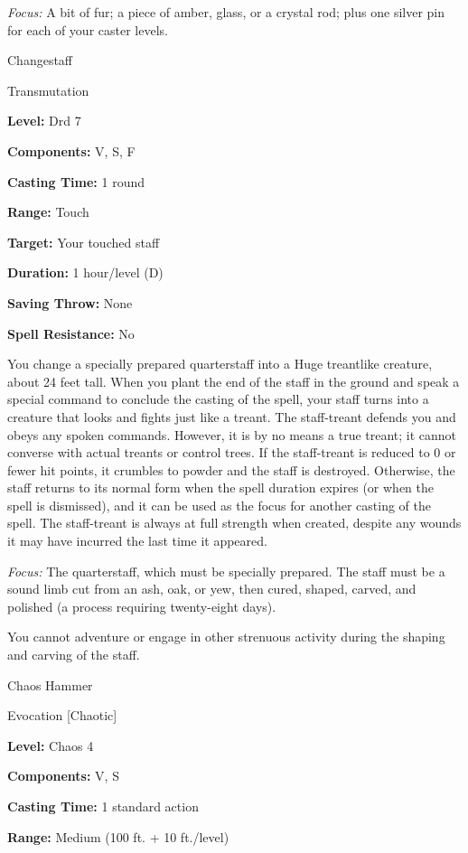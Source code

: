 \documentclass{article}
\begin{document}
\textit{Focus: }A bit of fur; a piece of amber, glass, or a crystal rod; plus one 
silver pin for each of your caster levels.

\vspace{12pt}
Changestaff

Transmutation

\textbf{Level:} Drd 7

\textbf{Components:} V, S, F

\textbf{Casting Time:} 1 round

\textbf{Range:} Touch

\textbf{Target:} Your touched staff

\textbf{Duration:} 1 hour/level (D)

\textbf{Saving Throw:} None

\textbf{Spell Resistance:} No

You change a specially prepared quarterstaff into a Huge treantlike creature, about 
24 feet tall. When you plant the end of the staff in the ground and speak a special 
command to conclude the casting of the spell, your staff turns into a creature 
that looks and fights just like a treant. The staff-treant defends you and obeys 
any spoken commands. However, it is by no means a true treant; it cannot converse 
with actual treants or control trees. If the staff-treant is reduced to 0 or fewer 
hit points, it crumbles to powder and the staff is destroyed. Otherwise, the staff 
returns to its normal form when the spell duration expires (or when the spell is 
dismissed), and it can be used as the focus for another casting of the spell. The 
staff-treant is always at full strength when created, despite any wounds it may 
have incurred the last time it appeared.

\textit{Focus: }The quarterstaff, which must be specially prepared. The staff must 
be a sound limb cut from an ash, oak, or yew, then cured, shaped, carved, and polished 
(a process requiring twenty-eight days).

You cannot adventure or engage in other strenuous activity during the shaping and 
carving of the staff.

\vspace{12pt}
Chaos Hammer

Evocation [Chaotic]

\textbf{Level:} Chaos 4

\textbf{Components:} V, S

\textbf{Casting Time:} 1 standard action

\textbf{Range: }Medium (100 ft. + 10 ft./level)
\end{document}
